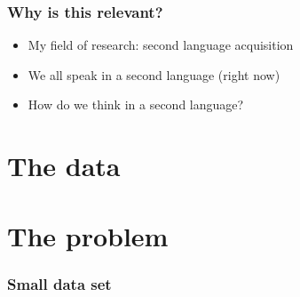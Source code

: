 \documentclass[]{beamer}
\begin{document}
\begin{frame}
	\frametitle{Why is this relevant?}
	\begin{itemize}
		\item My field of research: second language acquisition
		\item We all speak in a second language (right now)
		\item How do we think in a second language?
	\end{itemize}
\end{frame}



%	


\section{The data}

\begin{frame}
	\frametitle{}
\end{frame}


\section{The problem}

\begin{frame}
	\frametitle{Small data set}
\end{frame}
\end{document}
